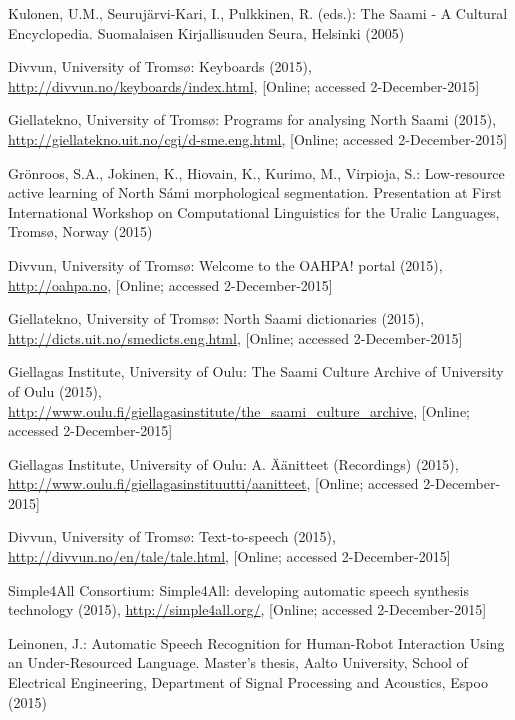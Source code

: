\documentclass[runningheads,a4paper]{llncs}
\begin{document}
\begin{thebibliography}{10}
Kulonen, U.M., Seuruj{\"a}rvi-Kari, I., Pulkkinen, R. (eds.): The Saami - A
  Cultural Encyclopedia. Suomalaisen Kirjallisuuden Seura, Helsinki (2005)

{Divvun, University of Troms{\o}}: Keyboards (2015),
  \url{http://divvun.no/keyboards/index.html}, [Online; accessed
  2-December-2015]

{Giellatekno, University of Troms{\o}}: Programs for analysing {North Saami}
  (2015), \url{http://giellatekno.uit.no/cgi/d-sme.eng.html}, [Online; accessed
  2-December-2015]

{Gr\"onroos}, S.A., Jokinen, K., Hiovain, K., Kurimo, M., Virpioja, S.:
  Low-resource active learning of {North S{\'a}mi} morphological segmentation.
  {Presentation at First International Workshop on Computational Linguistics
  for the Uralic Languages, Troms{\o}, Norway} (2015)

{Divvun, University of Troms{\o}}: Welcome to the {OAHPA!} portal (2015),
  \url{http://oahpa.no}, [Online; accessed 2-December-2015]

{Giellatekno, University of Troms{\o}}: {North Saami} dictionaries (2015),
  \url{http://dicts.uit.no/smedicts.eng.html}, [Online; accessed
  2-December-2015]

{Giellagas Institute, University of Oulu}: {The Saami Culture Archive of
  University of Oulu} (2015),
  \url{http://www.oulu.fi/giellagasinstitute/the_saami_culture_archive},
  [Online; accessed 2-December-2015]

{Giellagas Institute, University of Oulu}: {A. {\"A}{\"a}nitteet (Recordings)}
  (2015), \url{http://www.oulu.fi/giellagasinstituutti/aanitteet}, [Online;
  accessed 2-December-2015]

{Divvun, University of Troms{\o}}: Text-to-speech (2015),
  \url{http://divvun.no/en/tale/tale.html}, [Online; accessed 2-December-2015]

{Simple4All Consortium}: {Simple4All}: developing automatic speech synthesis
  technology (2015), \url{http://simple4all.org/}, [Online; accessed
  2-December-2015]

Leinonen, J.: Automatic Speech Recognition for Human-Robot Interaction Using an
  Under-Resourced Language. Master's thesis, Aalto University, School of
  Electrical Engineering, Department of Signal Processing and Acoustics, Espoo
  (2015)


\end{thebibliography}
\end{document}
